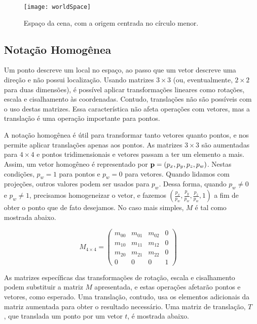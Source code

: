 \begin{figure}[!htb]
\center
\texttt{[image: worldSpace]}
\caption{Espaço da cena, com a origem centrada no círculo menor.}
\label{worldSpace}
\end{figure}

\subsection{Notação Homogênea}

Um ponto descreve um local no espaço, ao passo que um vetor descreve uma direção e não possui localização. Usando matrizes $3 \times 3$ (ou, eventualmente, $2 \times 2$ para duas dimensões), é possível aplicar transformações lineares como rotações, escala e cisalhamento às coordenadas. Contudo, translações não são possíveis com o uso destas matrizes. Essa característica não afeta operações com vetores, mas a translação é uma operação importante para pontos.


A notação homogênea é útil para transformar tanto vetores quanto pontos, e nos permite aplicar translações apenas aos pontos. As matrizes $3 \times 3$ são aumentadas para $4 \times 4$ e pontos tridimensionais e vetores passam a ter um elemento a mais. Assim, um vetor homogêneo é representado por ${\bf p} = (p_{x}, p_{y}, p_{z}, p_{w})$. Nestas condições, $p_{w} = 1$ para pontos e $p_{w} = 0$ para vetores. Quando lidamos com projeções, outros valores podem ser usados para $p_{w}$. Dessa forma, quando $p_{w} \neq 0$ e $p_{w} \neq 1$, precisamos homogeneizar o vetor, e fazemos $(\frac{p_{x}}{p_{w}}, \frac{p_{y}}{p_{w}}, \frac{p_{z}}{p_{w}}, 1)$ a fim de obter o ponto que de fato desejamos. No caso mais simples, $M$ é tal como mostrada abaixo.

\[ M_{4 \times 4} = \left(
\begin{array}{cccc}
m_{00} & m_{01} & m_{02} & 0 \\
m_{10} & m_{11} & m_{12} & 0 \\
m_{20} & m_{21} & m_{22} & 0 \\
0 & 0 & 0 & 1 
\end{array} \right)
\]

As matrizes específicas das transformações de rotação, escala e cisalhamento podem substituir a matriz $M$ apresentada, e estas operações afetarão pontos e vetores, como esperado. Uma translação, contudo, usa os elementos adicionais da matriz aumentada para obter o resultado necessário. Uma matriz de translação, $T$, que translada um ponto por um vetor $t$, é mostrada abaixo.

